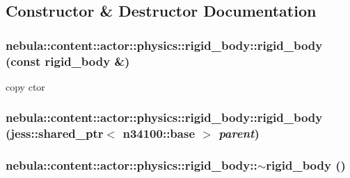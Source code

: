 \subsection{Constructor \& Destructor Documentation}
\hypertarget{classnebula_1_1content_1_1actor_1_1physics_1_1rigid__body_ac507978a93f6acbf1d81f41cffbc1c04}{
\subsubsection[{rigid\_\-body}]{\setlength{\rightskip}{0pt plus 5cm}nebula::content::actor::physics::rigid\_\-body::rigid\_\-body (const {\bf rigid\_\-body} \&)}}
\label{classnebula_1_1content_1_1actor_1_1physics_1_1rigid__body_ac507978a93f6acbf1d81f41cffbc1c04}


copy ctor \hypertarget{classnebula_1_1content_1_1actor_1_1physics_1_1rigid__body_a0bb7432214176e1f43ee3de3dfc9dfb8}{
\subsubsection[{rigid\_\-body}]{\setlength{\rightskip}{0pt plus 5cm}nebula::content::actor::physics::rigid\_\-body::rigid\_\-body (jess::shared\_\-ptr$<$ {\bf n34100::base} $>$ {\em parent})}}
\label{classnebula_1_1content_1_1actor_1_1physics_1_1rigid__body_a0bb7432214176e1f43ee3de3dfc9dfb8}
\hypertarget{classnebula_1_1content_1_1actor_1_1physics_1_1rigid__body_a008df6b4e7d84d31372d4a5b35e4871e}{
\subsubsection[{$\sim$rigid\_\-body}]{\setlength{\rightskip}{0pt plus 5cm}nebula::content::actor::physics::rigid\_\-body::$\sim$rigid\_\-body ()}}
\label{classnebula_1_1content_1_1actor_1_1physics_1_1rigid__body_a008df6b4e7d84d31372d4a5b35e4871e}



